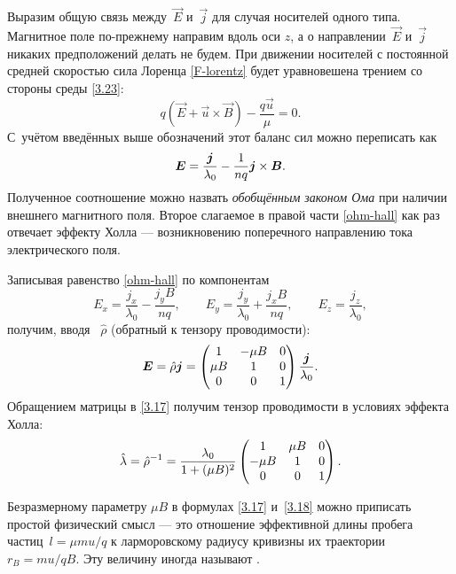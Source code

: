 Выразим общую связь между~$\vec{E}$ и~$\vec{j}$ для случая носителей одного типа.
Магнитное поле по-прежнему направим вдоль оси $z$, а о 
направлении~$\vec{E}$ и~$\vec{j}$ никаких предположений делать не будем.
При движении носителей с постоянной средней скоростью сила Лоренца
\eqref{F-lorentz} будет уравновешена трением со стороны среды \eqref{3.23}:
\begin{equation*}
    q(\vec{E}+\vec{u}\times \vec{B}) - \frac{q\vec{u}}{\mu} =0.
\end{equation*}
С~учётом введённых выше обозначений этот баланс сил можно переписать как
\begin{equation}
    \eqmark{ohm-hall}
    \vec{E} = \frac{\vec{j}}{\lambda_0} -
    \frac{1}{nq} \vec{j}\times\vec{B}.
\end{equation}
Полученное соотношение можно назвать \emph{обобщённым законом Ома} при
наличии внешнего магнитного поля. Второе слагаемое в правой части \eqref{ohm-hall}
как раз отвечает эффекту Холла --- возникновению поперечного 
направлению тока электрического поля.

Записывая равенство \eqref{ohm-hall} по компонентам
\[
E_x = \frac{j_x}{\lambda_0}  -  \frac{j_y B}{nq} ,\qquad
    E_y = \frac{j_y}{\lambda_0} +  \frac{j_xB}{nq} ,\qquad
    E_z = \frac{j_z}{\lambda_0},
\]
получим, вводя
~$\hat{\rho}$ (обратный к тензору
проводимости):
\begin{equation}
    \vec{E}=\hat{\rho}\vec{j}= \left(
    \begin{matrix}
        1 & -\mu B & {0} \\
        \mu B & 1 & {0} \\
        {0} &{0}& 1
    \end{matrix}
    \right)
    \frac{\vec{j}}{\lambda_0}.
    \eqmark{3.17}
\end{equation}
Обращением матрицы в \eqref{3.17} получим тензор проводимости
в условиях эффекта Холла:
\begin{equation}
    \hat{\lambda} = \hat{\rho}^{-1}=
    \frac{\lambda_0}{1+(\mu B)^2}\left(
    \begin{matrix}
        {1} & \mu B & {0} \\
        -\mu B & 1 & {0} \\
        {0} &{0}& 1 \\
    \end{matrix}
    \right).
    \eqmark{3.18}
\end{equation}

Безразмерному параметру $\mu B$ в формулах 
\eqref{3.17} и~\eqref{3.18} можно приписать простой
физический смысл --- это отношение эффективной длины пробега 
частиц~$l= \mu m u/q$ к ларморовскому радиусу кривизны их траектории $r_B=mu/qB$.
Эту величину иногда называют . 

